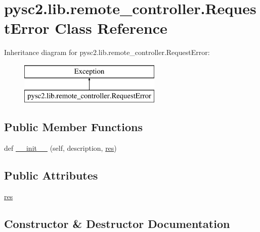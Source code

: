 \hypertarget{classpysc2_1_1lib_1_1remote__controller_1_1_request_error}{}\section{pysc2.\+lib.\+remote\+\_\+controller.\+Request\+Error Class Reference}
\label{classpysc2_1_1lib_1_1remote__controller_1_1_request_error}
Inheritance diagram for pysc2.\+lib.\+remote\+\_\+controller.\+Request\+Error\+:\begin{figure}[H]
\begin{center}
\leavevmode
\includegraphics[height=2.000000cm]{classpysc2_1_1lib_1_1remote__controller_1_1_request_error}
\end{center}
\end{figure}
\subsection*{Public Member Functions}
\begin{DoxyCompactItemize}
\item 
def \mbox{\hyperlink{classpysc2_1_1lib_1_1remote__controller_1_1_request_error_a7e77ea61ab686acc1cfb87a2a51a1dc3}{\+\_\+\+\_\+init\+\_\+\+\_\+}} (self, description, \mbox{\hyperlink{classpysc2_1_1lib_1_1remote__controller_1_1_request_error_a97e49b4d4a788e0100334a2c337557c5}{res}})
\end{DoxyCompactItemize}
\subsection*{Public Attributes}
\begin{DoxyCompactItemize}
\item 
\mbox{\hyperlink{classpysc2_1_1lib_1_1remote__controller_1_1_request_error_a97e49b4d4a788e0100334a2c337557c5}{res}}
\end{DoxyCompactItemize}


\subsection{Constructor \& Destructor Documentation}
\mbox{\label{classpysc2_1_1lib_1_1remote__controller_1_1_request_error_a7e77ea61ab686acc1cfb87a2a51a1dc3}} 
